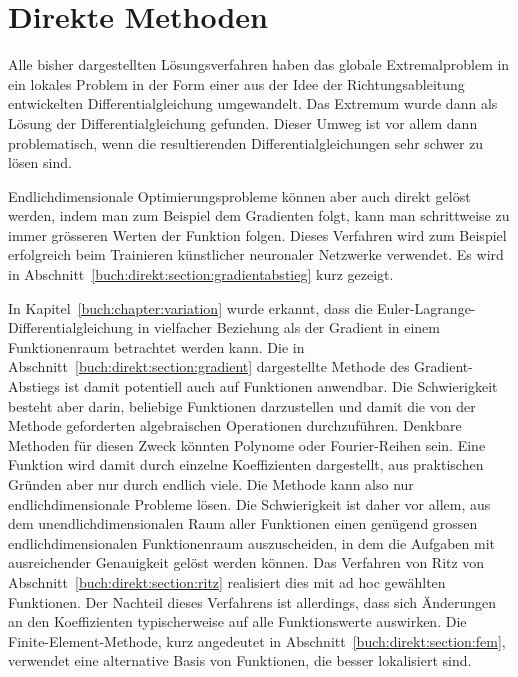 %
%
%
\chapter{Direkte Methoden
\label{buch:chapter:direkt}}
Alle bisher dargestellten Lösungsverfahren haben das globale Extremalproblem
in ein lokales Problem in der Form einer aus der Idee der Richtungsableitung
entwickelten Differentialgleichung umgewandelt.
Das Extremum wurde dann als Lösung der Differentialgleichung gefunden.
Dieser Umweg ist vor allem dann problematisch, wenn die resultierenden
Differentialgleichungen sehr schwer zu lösen sind.

Endlichdimensionale Optimierungsprobleme können aber auch direkt gelöst
werden, indem man zum Beispiel dem Gradienten folgt, kann man schrittweise
zu immer grösseren Werten der Funktion folgen.
Dieses Verfahren wird zum Beispiel erfolgreich beim Trainieren
künstlicher neuronaler Netzwerke verwendet.
Es wird in Abschnitt~\ref{buch:direkt:section:gradientabstieg}
kurz gezeigt.

In Kapitel~\ref{buch:chapter:variation} wurde erkannt, dass die
Euler-Lagrange-Differentialgleichung in vielfacher Beziehung als 
der Gradient in einem Funktionenraum betrachtet werden kann.
Die in Abschnitt~\ref{buch:direkt:section:gradient} dargestellte
Methode des Gradient-Abstiegs ist damit potentiell auch auf Funktionen
anwendbar.
Die Schwierigkeit besteht aber darin, beliebige Funktionen darzustellen
und damit die von der Methode geforderten algebraischen Operationen
durchzuführen.
Denkbare Methoden für diesen Zweck könnten Polynome oder Fourier-Reihen
sein.
Eine Funktion wird damit durch einzelne Koeffizienten dargestellt, aus
praktischen Gründen aber nur durch endlich viele.
Die Methode kann also nur endlichdimensionale Probleme lösen.
Die Schwierigkeit ist daher vor allem, aus dem unendlichdimensionalen
Raum aller Funktionen einen genügend grossen endlichdimensionalen
Funktionenraum auszuscheiden, in dem die Aufgaben mit ausreichender
Genauigkeit gelöst werden können.
Das Verfahren von Ritz von Abschnitt~\ref{buch:direkt:section:ritz}
realisiert dies mit ad hoc gewählten Funktionen.
Der Nachteil dieses Verfahrens ist allerdings, dass sich Änderungen an
den Koeffizienten typischerweise auf alle Funktionswerte auswirken.
Die Finite-Element-Methode, kurz angedeutet in
Abschnitt~\ref{buch:direkt:section:fem}, verwendet eine alternative Basis
von Funktionen, die besser lokalisiert sind.




